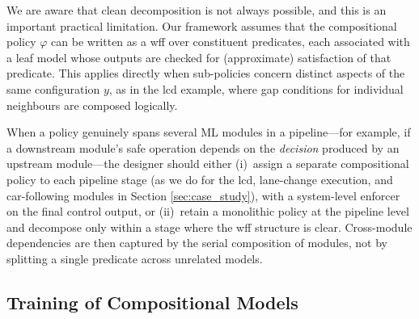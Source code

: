 We are aware that clean decomposition is not always possible, and this is an important practical limitation. Our framework assumes that the compositional policy $\varphi$ can be written as a wff over constituent predicates, each associated with a leaf model whose outputs are checked for (approximate) satisfaction of that predicate. This applies directly when sub-policies concern distinct aspects of the same configuration $y$, as in the \gls{lcd} example, where gap conditions for individual neighbours are composed logically. 

When a policy genuinely spans several ML modules in a pipeline---for example, if a downstream module's safe operation depends on the \emph{decision} produced by an upstream module---the designer should either (i)~assign a separate compositional policy to each pipeline stage (as we do for the \gls{lcd}, lane-change execution, and car-following modules in Section \ref{sec:case_study}), with a system-level enforcer on the final control output, or (ii)~retain a monolithic policy at the pipeline level and decompose only within a stage where the wff structure is clear. Cross-module dependencies are then captured by the serial composition of modules, not by splitting a single predicate across unrelated models.


\subsection{Training of Compositional Models}
\label{sec:compositional_policy_based_training}


